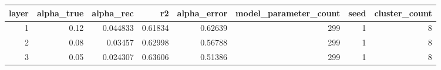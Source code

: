\begin{tabular}{rrrrrrrr}
\toprule
layer & alpha\_true & alpha\_rec & r2 & alpha\_error & model\_parameter\_count & seed & cluster\_count \\
\midrule
1 & 0.12 & 0.044833 & 0.61834 & 0.62639 & 299 & 1 & 8 \\
2 & 0.08 & 0.03457 & 0.62998 & 0.56788 & 299 & 1 & 8 \\
3 & 0.05 & 0.024307 & 0.63606 & 0.51386 & 299 & 1 & 8 \\
\bottomrule
\end{tabular}
